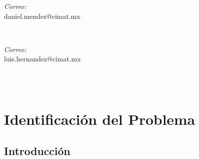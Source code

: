 \documentclass{report}
\makeatletter
\let\thedate\@date
\makeatother
\begin{document}
\begin{titlepage}
	\begin{minipage}{0.5\textwidth}
		\begin{flushleft} \large
			\emph{Correo:}\\
			daniel.mendez@cimat.mx
		\end{flushleft}
	\end{minipage}~
	\begin{minipage}{0.4\textwidth}
		\begin{flushright} \large
			\emph{Correo:} \\
			luis.hernandez@cimat.mx
		\end{flushright}
	\end{minipage}\\[2 cm]
		
	{\large \thedate}\\[2 cm]
 
	\vfill
	
\end{titlepage}


\tableofcontents
\pagebreak

\chapter{Identificación del Problema}
    
    \section{Introducción}
\end{document}
